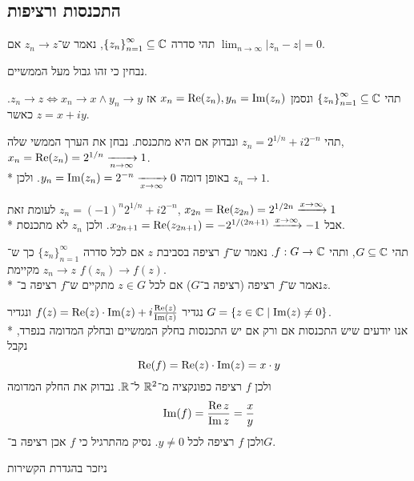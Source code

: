 \subsection{התכנסות ורציפות}
\begin{definition}
	תהי סדרה ${\{z_n\}}_{n = 1}^\infty \subseteq \mathbb{C}$,
	נאמר ש־$z_n \to z$ אם $\lim_{n \to \infty} |z_n - z| = 0$.
\end{definition}
נבחין כי זהו גבול מעל הממשיים.
\begin{exercise}
	תהי ${\{z_n\}}_{n = 1}^\infty \subseteq \mathbb{C}$ ונסמן $x_n = \operatorname{Re}(z_n), y_n = \operatorname{Im}(z_n)$ אז $z_n \to z \iff x_n \to x \land y_n \to y$.
	כאשר $z = x + iy$.
\end{exercise}
\begin{example}
	תהי $z_n = 2^{1/n} + i2^{-n}$ ונבדוק אם היא מתכנסת.
	נבחן את הערך הממשי שלה, $x_n = \operatorname{Re}(z_n) = 2^{1/n} \xrightarrow[n \to \infty]{} 1$. \\*
	באופן דומה $y_n = \operatorname{Im}(z_n) = 2^{-n} \xrightarrow[x \to \infty]{} 0$.
	ולכן $z_n \to 1$.
\end{example}
\begin{example}
	לעומת זאת $z_n = {(-1)}^n 2^{1/n} + i 2^{-n}$,
	$x_{2n} = \operatorname{Re}(z_{2n}) = 2^{1/2n} \xrightarrow{x \to \infty} 1$ \\*
	אבל $x_{2n + 1} = \operatorname{Re}(z_{2n + 1}) = - 2^{1/(2n + 1)} \xrightarrow{x \to \infty} -1$.
	ולכן $z_n$ לא מתכנסת.
\end{example}
\begin{definition}
	תהי $G \subseteq \mathbb{C}$, ותהי $f : G \to \mathbb{C}$.
	נאמר ש־$f$ רציפה בסביבת $z$ אם לכל סדרה ${\{z_n\}}_{n = 1}^\infty$ כך ש־$z_n \to z$ מקיימת $f(z_n) \to f(z)$. \\*
	נאמר ש־$f$ רציפה (רציפה ב־$G$) אם לכל $z \in G$ מתקיים ש־$f$ רציפה ב־$z$.
\end{definition}
\begin{example}
	נגדיר $f(z) = \operatorname{Re}(z) \cdot \operatorname{Im}(z) + i \frac{\operatorname{Re}(z)}{\operatorname{Im}(z)}$ ונגדיר $G = \{ z \in \mathbb{C} \mid \operatorname{Im}(z) \ne 0 \}$. \\*
	אנו יודעים שיש התכנסות אם ורק אם יש התכנסות בחלק הממשיים ובחלק המדומה בנפרד, נקבל
	\[
		\operatorname{Re}(f) = \operatorname{Re}(z) \cdot \operatorname{Im}(z) = x \cdot y
	\]
	ולכן $f$ רציפה כפונקציה מ־$\mathbb{R}^2$ ל־$\mathbb{R}$.
	נבדוק את החלק המדומה
	\[
		\operatorname{Im}(f) = \frac{\operatorname{Re} z}{\operatorname{Im} z} = \frac{x}{y}
	\]
	ולכן $f$ רציפה לכל $y \ne 0$.
	נסיק מהתרגיל כי $f$ אכן רציפה ב־$G$.
\end{example}
ניזכר בהגדרת הקשירות
